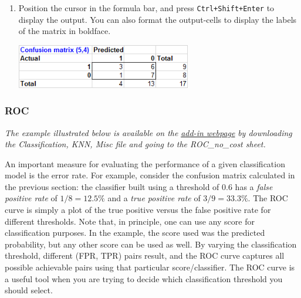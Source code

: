 \documentclass[12pt]{article}
\begin{document}
\begin{enumerate}
\medskip

\item Position the cursor in the formula bar, and press \texttt{Ctrl+Shift+Enter} to display the output. You can also format the output-cells to display the labels of the matrix in boldface.

\medskip

\centerline{\includegraphics[width=3in]{figures/conf5.png}}

\end{enumerate}

\subsubsection{ROC}

\textit{The example illustrated below is available on the}  \href{https://www8.gsb.columbia.edu/bizanalytics/excel-add-in/multiplatform#h-4}{ \textit{add-in webpage}}
 \textit{by downloading the Classification, KNN, Misc file and going to the ROC\_no\_cost sheet.}

An important measure for evaluating the performance of a given classification model is the error rate. For example, consider the confusion matrix calculated in the previous section: the classifier built using a threshold of $0.6$ has a \textit{false positive rate} of $1/8=12.5\%$ and a \textit{true positive rate} of $3/9=33.3\%$. The ROC curve is simply a plot of the true positive versus the false positive rate for different thresholds. Note that, in principle, one can use any score for classification purposes. In the example, the score used was the predicted probability, but any other score can be used as well. By varying the classification threshold, different (FPR, TPR) pairs result, and the ROC curve captures all possible achievable pairs using that particular score/classifier. The ROC curve is a useful tool when you are trying to decide which classification threshold you should select.
\end{document}

